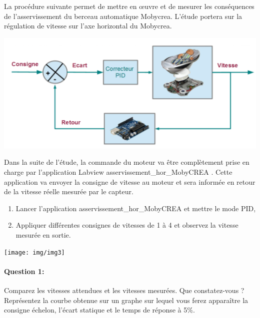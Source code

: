 

\ifdef{\public}{\cleardoublepage}{\newpage}



La procédure suivante permet de mettre en \oe uvre et de mesurer les conséquences de l'asservissement du berceau automatique Mobycrea.
L'étude portera sur la régulation de vitesse sur l'axe horizontal du Mobycrea.

\begin{center}
 \includegraphics[width=0.8\linewidth]{img/img1}
\end{center}

Dans la suite de l'étude, la commande du moteur va être complètement prise en charge par l'application Labview \og asservissement\_hor\_MobyCREA \fg. Cette application va envoyer la consigne de vitesse au moteur et sera informée en retour de la vitesse réelle mesurée par le capteur.
\begin{enumerate}
 \item Lancer l'application \og asservissement\_hor\_MobyCREA \fg et mettre le mode PID,
 \item Appliquer différentes consignes de vitesses de 1 à 4 et observez la vitesse mesurée en sortie. 
\end{enumerate} 

\begin{center}
 \texttt{[image: img/img3]}
\end{center}

\paragraph{Question 1:} Comparez les vitesses attendues et les vitesses mesurées. Que constatez-vous ? Représentez la courbe obtenue sur un graphe sur lequel vous ferez apparaître la consigne échelon, l'écart statique et le temps de réponse à 5\%.

